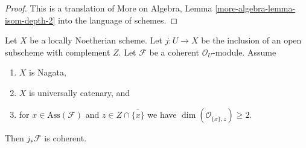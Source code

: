 \begin{proof}
This is a translation of More on Algebra, Lemma
\ref{more-algebra-lemma-isom-depth-2} into the language of schemes.
\end{proof}

\begin{lemma}
\label{lemma-finiteness-pushforward}
Let $X$ be a locally Noetherian scheme.
Let $j : U \to X$ be the inclusion of an
open subscheme with complement $Z$. Let $\mathcal{F}$ be a coherent
$\mathcal{O}_U$-module. Assume
\begin{enumerate}
\item $X$ is Nagata,
\item $X$ is universally catenary, and
\item for $x \in \text{Ass}(\mathcal{F})$ and
$z \in Z \cap \overline{\{x\}}$ we have
$\dim(\mathcal{O}_{\overline{\{x\}}, z}) \geq 2$.
\end{enumerate}
Then $j_*\mathcal{F}$ is coherent.
\end{lemma}

